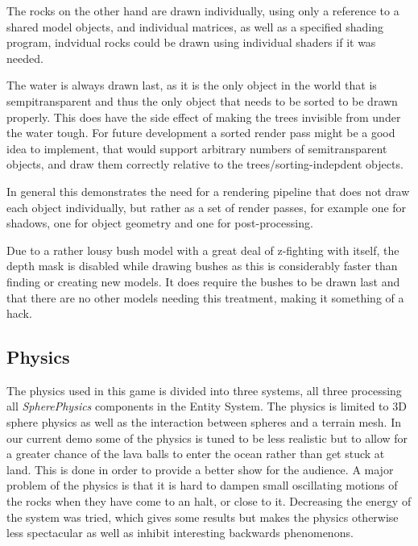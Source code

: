 The rocks on the other hand are drawn individually, using only a reference to a shared model objects, and individual matrices, as well as a specified shading program, indvidual rocks could be drawn using individual shaders if it was needed.

The water is always drawn last, as it is the only object in the world that is sempitransparent and thus the only object that needs to be sorted to be drawn properly. This does have the side effect of making the trees invisible from under the water tough. For future development a sorted render pass might be a good idea to implement, that would support arbitrary numbers of semitransparent objects, and draw them correctly relative to the trees/sorting-indepdent objects.

In general this demonstrates the need for a rendering pipeline that does not draw each object individually, but rather as a set of render passes, for example one for shadows, one for object geometry and one for post-processing.

Due to a rather lousy bush model with a great deal of z-fighting with itself, the depth mask is disabled while drawing bushes as this is considerably faster than finding or creating new models. It does require the bushes to be drawn last and that there are no other models needing this treatment, making it something of a hack.

\newpage
\subsection{Physics}
The physics used in this game is divided into three systems, all three processing all \textit{SpherePhysics} components in the Entity System. The physics is limited to 3D sphere physics as well as the interaction between spheres and a terrain mesh. In our current demo some of the physics is tuned to be less realistic but to allow for a greater chance of the lava balls to enter the ocean rather than get stuck at land. This is done in order to provide a better show for the audience. A major problem of the physics is that it is hard to dampen small oscillating motions of the rocks when they have come to an halt, or close to it. Decreasing the energy of the system was tried, which gives some results but makes the physics otherwise less spectacular as well as inhibit interesting backwards phenomenons.


